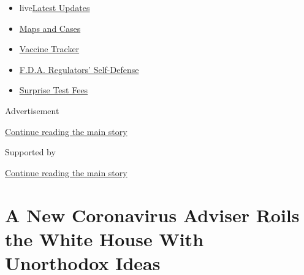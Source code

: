 \begin{itemize}
\tightlist
\item
  live\href{https://www.nytimes3xbfgragh.onion/2020/09/11/world/covid-19-coronavirus.html?name=styln-coronavirus-national\&region=TOP_BANNER\&block=storyline_menu_recirc\&action=click\&pgtype=Article\&impression_id=71bab1e1-f4b5-11ea-b05b-4ba005ac198e\&variant=undefined}{Latest
  Updates}
\item
  \href{https://www.nytimes3xbfgragh.onion/interactive/2020/us/coronavirus-us-cases.html?name=styln-coronavirus-national\&region=TOP_BANNER\&block=storyline_menu_recirc\&action=click\&pgtype=Article\&impression_id=71bab1e2-f4b5-11ea-b05b-4ba005ac198e\&variant=undefined}{Maps
  and Cases}
\item
  \href{https://www.nytimes3xbfgragh.onion/interactive/2020/science/coronavirus-vaccine-tracker.html?name=styln-coronavirus-national\&region=TOP_BANNER\&block=storyline_menu_recirc\&action=click\&pgtype=Article\&impression_id=71bab1e3-f4b5-11ea-b05b-4ba005ac198e\&variant=undefined}{Vaccine
  Tracker}
\item
  \href{https://www.nytimes3xbfgragh.onion/2020/09/10/us/politics/fda-coronavirus-vaccine.html?name=styln-coronavirus-national\&region=TOP_BANNER\&block=storyline_menu_recirc\&action=click\&pgtype=Article\&impression_id=71bad8f0-f4b5-11ea-b05b-4ba005ac198e\&variant=undefined}{F.D.A.
  Regulators' Self-Defense}
\item
  \href{https://www.nytimes3xbfgragh.onion/2020/09/09/upshot/coronavirus-surprise-test-fees.html?name=styln-coronavirus-national\&region=TOP_BANNER\&block=storyline_menu_recirc\&action=click\&pgtype=Article\&impression_id=71bad8f1-f4b5-11ea-b05b-4ba005ac198e\&variant=undefined}{Surprise
  Test Fees}
\end{itemize}

Advertisement

\protect\hyperlink{after-top}{Continue reading the main story}

Supported by

\protect\hyperlink{after-sponsor}{Continue reading the main story}

\hypertarget{a-new-coronavirus-adviser-roils-the-white-house-with-unorthodox-ideas}{%
\section{A New Coronavirus Adviser Roils the White House With Unorthodox
Ideas}\label{a-new-coronavirus-adviser-roils-the-white-house-with-unorthodox-ideas}}

